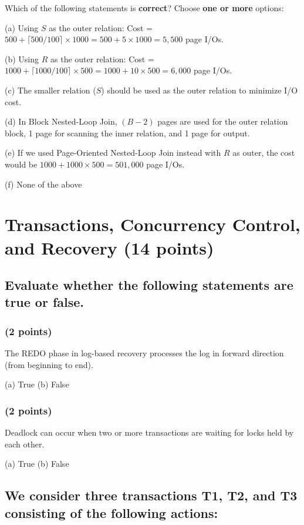 \documentclass[11pt,a4paper]{article}
\begin{document}
Which of the following statements is \textbf{correct}? Choose \textbf{one or more} options:

(a) Using $S$ as the outer relation: Cost = $500 + \lceil 500/100 \rceil \times 1000 = 500 + 5 \times 1000 = 5,500$ page I/Os.

(b) Using $R$ as the outer relation: Cost = $1000 + \lceil 1000/100 \rceil \times 500 = 1000 + 10 \times 500 = 6,000$ page I/Os.

(c) The smaller relation ($S$) should be used as the outer relation to minimize I/O cost.

(d) In Block Nested-Loop Join, $(B-2)$ pages are used for the outer relation block, 1 page for scanning the inner relation, and 1 page for output.

(e) If we used Page-Oriented Nested-Loop Join instead with $R$ as outer, the cost would be $1000 + 1000 \times 500 = 501,000$ page I/Os.

(f) None of the above

\newpage

\section{Transactions, Concurrency Control, and Recovery (14 points)}

\subsection{Evaluate whether the following statements are true or false.}

\subsubsection{(2 points)}
The REDO phase in log-based recovery processes the log in forward direction (from beginning to end).

(a) True \quad\quad (b) False

\subsubsection{(2 points)}
Deadlock can occur when two or more transactions are waiting for locks held by each other.

(a) True \quad\quad (b) False

\subsection{We consider three transactions T1, T2, and T3 consisting of the following actions:}
\end{document}
